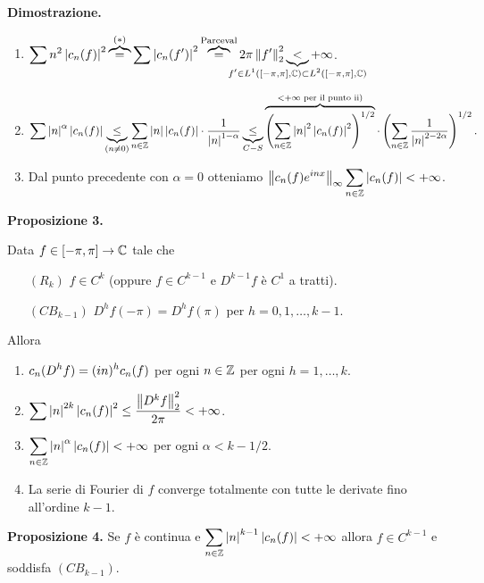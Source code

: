 \textbf{Dimostrazione.}
\begin{enumerate}

\item $\ds \sum n^2 \left| c_n(f) \right|^2 \overbrace{=}^{(\ast)} \sum \left| c_n(f') \right|^2
\overbrace{=}^{\text{Parceval} } 2\pi \norm{f'}_2^2 \underbrace{<}_{\mathclap{f' \in L^1([-\pi,\pi], \C) \subset L^2([-\pi,\pi], \C) }} +\infty$.

\item $\displaystyle \sum \left| n \right|^\alpha \left| c_n(f) \right| 
\underbrace{\leq}_{(n \neq 0)} \sum_{n \in \mathbb Z} \left| n \right| \left| c_n(f) \right| \cdot \frac{1}{\left| n \right|^{1-\alpha }}
\underbrace{\leq}_{C-S} \overbrace{\left( \sum_{n \in \mathbb Z} \left| n \right|^2 \left| c_n(f) \right|^2  \right)^{1/2}}^{< +\infty \text{ per il punto ii)}} \cdot \left( \sum_{n \in \mathbb Z} \frac{1}{\left| n \right|^{2-2\alpha }}  \right)^{1/2}. 
$

\item Dal punto precedente con $\alpha = 0$ otteniamo $\displaystyle \left\lVert c_n(f) e^{inx} \right\rVert_\infty \sum_{n \in \mathbb Z} \left| c_n(f) \right| < +\infty $.
\end{enumerate}

\hypertarget{prop:2021-08nov_prop_3}{%
\textbf{Proposizione 3.}} Data $f \in [-\pi,\pi] \to \mathbb C$ tale che
\begin{itemize}
\item[$(R_k)$] $f \in C^k$ (oppure $f \in C^{k-1}$ e $D^{k-1}f$ è $C^1$ a tratti).

\item[$(CB_{k-1})$] $D^h f(-\pi) = D^h f(\pi)$ per $h = 0,1,\ldots, k-1$.
\end{itemize}
Allora
\begin{enumerate}
\item $\displaystyle c_n (D^h f) = (in)^h c_n(f)$ per ogni $n \in \mathbb Z$ per ogni $h = 1,\ldots,k$.

\item $\displaystyle \sum \left| n \right|^{2k} \left| c_n(f) \right|^2 \leq \frac{\left\lVert D^k f \right\rVert_2^2}{2\pi} < +\infty$.

\item $\displaystyle \sum_{n \in \mathbb Z} \left| n \right|^\alpha \left| c_n(f) \right| < +\infty $ per ogni $\alpha < k - 1/2$.

\item La serie di Fourier di $f$ converge totalmente con tutte le derivate fino all'ordine $k-1$.
\end{enumerate}

\textbf{Proposizione 4.} Se $f$ è continua e $\displaystyle \sum_{n \in \mathbb Z} \left| n \right|^{k-1} \left| c_n(f) \right| < +\infty $ allora $f \in C^{k-1}$ e soddisfa $(CB_{k-1})$.

